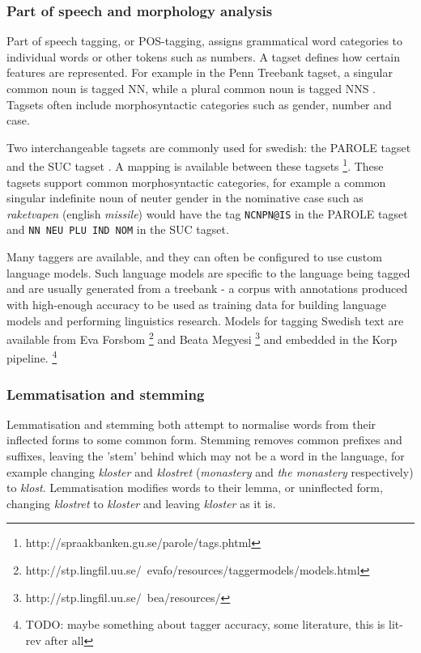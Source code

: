 \documentclass[a4paper]{report}
\newcommand{\todo}[1]{\footnote{{\color{red} TODO: #1}}}
\begin{document}
\subsubsection{Part of speech and morphology analysis}

Part of speech tagging, or POS-tagging, assigns grammatical word categories to individual words or other tokens such as numbers.
A tagset defines how certain features are represented.
For example in the Penn Treebank tagset, a singular common noun is tagged NN, while a plural common noun is tagged NNS \citep{Marcus93Penn}.
Tagsets often include morphosyntactic categories such as gender, number and case.

Two interchangeable tagsets are commonly used for swedish: the PAROLE tagset and the SUC tagset \citep{Forsbom08Tagging}.
A mapping is available between these tagsets \footnote{http://spraakbanken.gu.se/parole/tags.phtml}.
These tagsets support common morphosyntactic categories, for example a common singular indefinite noun of neuter gender in the nominative case such as \emph{raketvapen} (english \emph{missile}) would have the tag {\tt NCNPN@IS} in the PAROLE tagset and {\tt NN NEU PLU IND NOM} in the SUC tagset.

Many taggers are available, and they can often be configured to use custom language models.
Such language models are specific to the language being tagged and are usually generated from a treebank - a corpus with annotations produced with high-enough accuracy to be used as training data for building language models and performing linguistics research.
Models for tagging Swedish text are available from Eva Forsbom \footnote{http://stp.lingfil.uu.se/~evafo/resources/taggermodels/models.html} and Beata Megyesi \footnote{http://stp.lingfil.uu.se/~bea/resources/} and embedded in the Korp pipeline. \todo{maybe something about tagger accuracy, some literature, this is lit-rev after all}

\subsubsection{Lemmatisation and stemming}

Lemmatisation and stemming both attempt to normalise words from their inflected forms to some common form.
Stemming removes common prefixes and suffixes, leaving the 'stem' behind which may not be a word in the language, for example changing \emph{kloster} and \emph{klostret} (\emph{monastery} and \emph{the monastery} respectively) to \emph{klost}.
Lemmatisation modifies words to their lemma, or uninflected form, changing \emph{klostret} to \emph{kloster} and leaving \emph{kloster} as it is.
\end{document}
